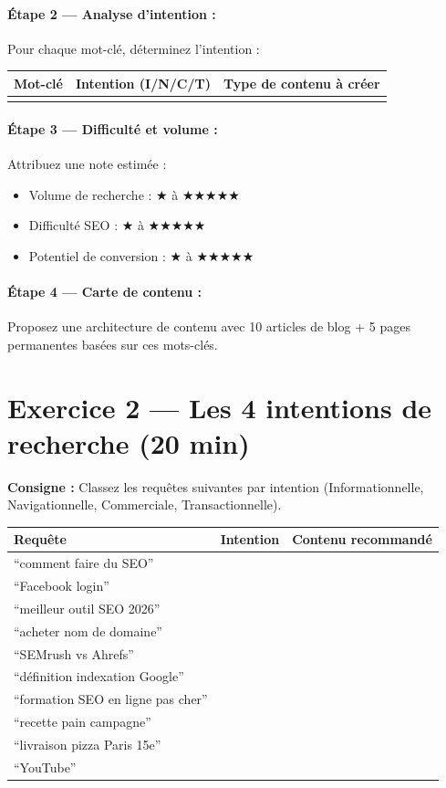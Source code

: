 \documentclass[12pt,a4paper]{report}
\begin{document}
\paragraph{\'{E}tape 2 --- Analyse d'intention :} Pour chaque mot-cl\'{e}, d\'{e}terminez l'intention :
\begin{longtable}{lll}
\toprule
Mot-cl\'{e} & Intention (I/N/C/T) & Type de contenu \`{a} cr\'{e}er \\
\midrule
\endhead
\bottomrule
\endfoot
& & \\
\bottomrule
\end{longtable}

\paragraph{\'{E}tape 3 --- Difficult\'{e} et volume :} Attribuez une note estim\'{e}e :
\begin{itemize}
    \item Volume de recherche : $\bigstar$ \`{a} $\bigstar\bigstar\bigstar\bigstar\bigstar$
    \item Difficult\'{e} SEO : $\bigstar$ \`{a} $\bigstar\bigstar\bigstar\bigstar\bigstar$
    \item Potentiel de conversion : $\bigstar$ \`{a} $\bigstar\bigstar\bigstar\bigstar\bigstar$
\end{itemize}

\paragraph{\'{E}tape 4 --- Carte de contenu :} Proposez une architecture de contenu avec 10 articles de blog + 5 pages permanentes bas\'{e}es sur ces mots-cl\'{e}s.

\section{Exercice 2 --- Les 4 intentions de recherche (20 min)}

\textbf{Consigne :} Classez les requ\^{e}tes suivantes par intention (Informationnelle, Navigationnelle, Commerciale, Transactionnelle).

\begin{longtable}{lll}
\toprule
Requ\^{e}te & Intention & Contenu recommand\'{e} \\
\midrule
\endhead
\bottomrule
\endfoot
``comment faire du SEO'' & & \\
``Facebook login'' & & \\
``meilleur outil SEO 2026'' & & \\
``acheter nom de domaine'' & & \\
``SEMrush vs Ahrefs'' & & \\
``d\'{e}finition indexation Google'' & & \\
``formation SEO en ligne pas cher'' & & \\
``recette pain campagne'' & & \\
``livraison pizza Paris 15e'' & & \\
``YouTube'' & & \\
\bottomrule
\end{longtable}
\end{document}
